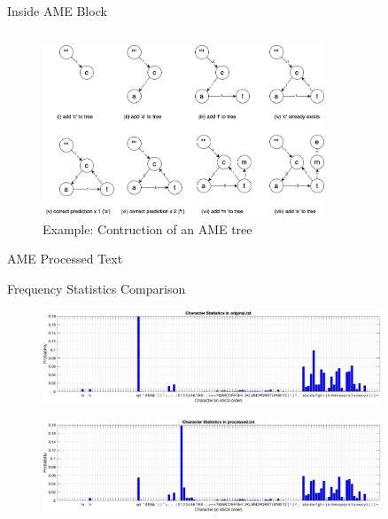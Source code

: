 \documentclass[mathserif, 13pt, aspectratio=1610]{beamer}
\begin{document}
\begin{frame}{Inside AME Block}
	\begin{columns}[T]
		\centering
		\centering
	\end{columns}
	\begin{figure}[h!]
		\centering
		\includegraphics[width=0.75\textwidth]{AMEtree.png}
		\caption{Example: Contruction of an AME tree}
	\end{figure}
\end{frame}

\begin{frame}{AME Processed Text}
	\vfill
\end{frame}

\begin{frame}{Frequency Statistics Comparison}
	\begin{figure}[h!]
		\centering
		\includegraphics[width=0.9\textwidth]{originalStat.png}
	\end{figure}
	\begin{figure}[h!]
		\centering
		\includegraphics[width=0.9\textwidth]{processedStat.png}
	\end{figure}
\end{frame}
\end{document}
